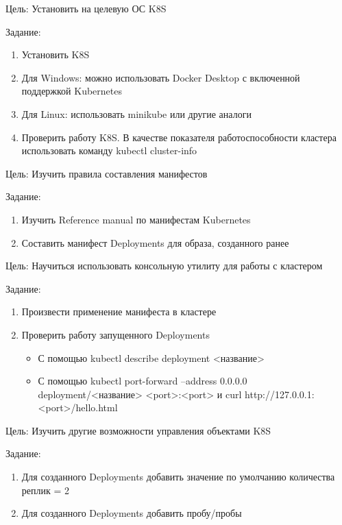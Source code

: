 
Цель: Установить на целевую ОС K8S

Задание:
\begin{enumerate}
    \item Установить K8S
    \item Для Windows: можно использовать Docker Desktop с включенной поддержкой Kubernetes
    \item Для Linux: использовать minikube или другие аналоги
    \item Проверить работу K8S. В качестве показателя работоспособности кластера использовать команду kubectl cluster-info
\end{enumerate}


Цель: Изучить правила составления манифестов

Задание:
\begin{enumerate}
    \item Изучить Reference manual по манифестам Kubernetes
    \item Составить манифест Deployments для образа, созданного ранее
\end{enumerate}


Цель: Научиться использовать консольную утилиту для работы с кластером

Задание:
\begin{enumerate}
    \item Произвести применение манифеста в кластере
    \item Проверить работу запущенного Deployments
    \begin{itemize}
        \item С помощью kubectl describe deployment <название>
        \item С помощью kubectl port-forward --address 0.0.0.0 deployment/<название> <port>:<port> и  curl http://127.0.0.1:<port>/hello.html
    \end{itemize}
\end{enumerate}


Цель: Изучить другие возможности управления объектами K8S

Задание:
\begin{enumerate}
    \item Для созданного Deployments добавить значение по умолчанию количества реплик = 2
    \item Для созданного Deployments добавить пробу/пробы
\end{enumerate}

\clearpage